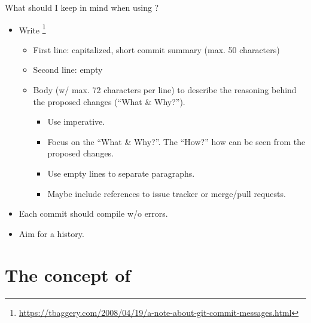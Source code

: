 \begin{frame}{What should I keep in mind when using ?}
\begin{itemize}
\item Write \footnote{\scriptsize{\url{https://tbaggery.com/2008/04/19/a-note-about-git-commit-messages.html}}}
\begin{itemize}
\item First line: capitalized, short commit summary (max. 50 characters)
\item Second line: empty
\item Body (w/ max. 72 characters per line) to describe the reasoning behind the proposed changes (``What \& Why?'').
\begin{itemize}
\item Use imperative.
\item Focus on the ``What \& Why?''. The ``How?'' how can be seen from the proposed changes.
\item Use empty lines to separate paragraphs.
\item Maybe include references to issue tracker or merge/pull requests.
\end{itemize}
\end{itemize}
\item Each commit should compile w/o errors.
\item Aim for a  history.
\end{itemize}
\end{frame}

\section{The concept of }

